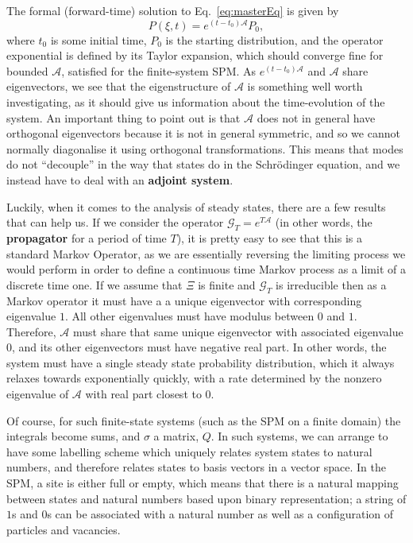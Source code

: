 The formal (forward-time) solution to Eq.~\ref{eq:masterEq} is given by
\begin{equation}
 P(\xi, t) = e^{(t-t_0)\mathcal{A}}P_0,
\end{equation}
where $t_0$ is some initial time, $P_0$ is the starting distribution, and the operator
exponential is defined by its Taylor expansion, which should converge fine for bounded
$\mathcal{A}$, satisfied for the finite-system SPM. As 
$e^{(t-t_0)\mathcal{A}}$ and $\mathcal{A}$ share eigenvectors, we see that the
eigenstructure of $\mathcal{A}$ is something well worth investigating, as it should
give us information about the time-evolution of the system. An important thing to point
out is that $\mathcal{A}$ does not in general have orthogonal eigenvectors because it is
not in general symmetric,
and so we cannot normally diagonalise it using orthogonal transformations. This means that modes do not ``decouple'' in the way that states do in the 
Schr\"{o}dinger equation, and we instead have to deal with an \textbf{adjoint system}.

Luckily, when it comes to the analysis of steady states, there are a few results that
can help us. If we consider the operator $\mathcal{G}_T = e^{T\mathcal{A}}$ (in other words, the 
\textbf{propagator} for a period of time $T$), it is pretty easy to see that this is
a standard Markov Operator, as we are essentially reversing the limiting process
we would perform in order to define a continuous time Markov process as a limit of
a discrete time one. If we assume that $\Xi$ is finite and $\mathcal{G}_T$ is irreducible then as
a Markov operator it must have a  a unique eigenvector with corresponding eigenvalue $1$.
All other eigenvalues must have modulus between $0$ and $1$. Therefore, $\mathcal{A}$
must share that same unique eigenvector with associated eigenvalue $0$, and its other
eigenvectors must have negative real part. In other words, the system must have a single
steady state probability distribution, which it always relaxes towards exponentially
quickly, with a rate determined by the nonzero eigenvalue of $\mathcal{A}$ with real
part closest to $0$.

Of course, for such finite-state systems (such as the SPM on a finite domain) the integrals become sums, and $\sigma$ a matrix, $Q$. In such systems, we can arrange to have some labelling scheme which uniquely relates system states to natural numbers, and therefore
relates states to basis vectors in a vector space. In the SPM, a site is either full or empty, which means that there is a natural mapping between states and natural numbers based upon binary representation;
a string of $1$s and $0$s can be associated with a natural number as well as a configuration of particles and vacancies.

